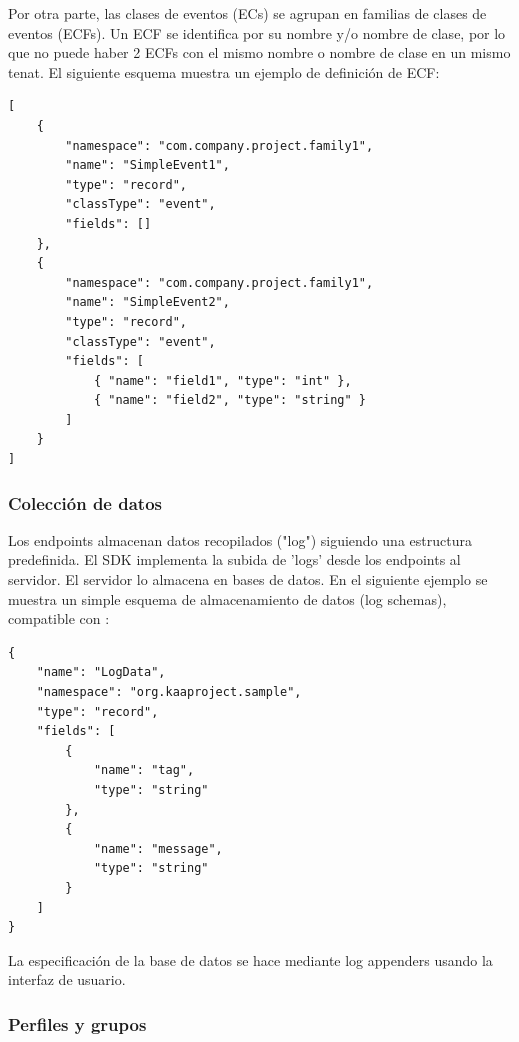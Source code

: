 \documentclass[12pt, twoside]{book}
\newcommand{\MYhref}[3][blue]{\href{#2}{\color{#1}{#3}}}
\begin{document}
Por otra parte, las clases de eventos (ECs) se agrupan en familias de clases de eventos (ECFs). Un ECF se identifica por su nombre y/o nombre de clase, por lo que no puede haber 2 ECFs con el mismo nombre o nombre de clase en un mismo tenat. El siguiente esquema muestra un ejemplo de definición de ECF:
\begin{lstlisting}
[
    {
        "namespace": "com.company.project.family1",
        "name": "SimpleEvent1",
        "type": "record",
        "classType": "event",
        "fields": []
    },
    {
        "namespace": "com.company.project.family1",
        "name": "SimpleEvent2",
        "type": "record",
        "classType": "event",
        "fields": [
            { "name": "field1", "type": "int" },
            { "name": "field2", "type": "string" }
        ]
    }
]
\end{lstlisting}
\subsubsection*{Colección de datos}
Los endpoints almacenan datos recopilados ("log") siguiendo una estructura predefinida. El SDK implementa la subida de 'logs' desde los endpoints al servidor. El servidor lo almacena en bases de datos. En el siguiente ejemplo se muestra un simple esquema de almacenamiento de datos (log schemas), compatible con \MYhref{http://avro.apache.org/docs/current/spec.html}{Avro Schema}:
\begin{lstlisting}
{
    "name": "LogData",
    "namespace": "org.kaaproject.sample",
    "type": "record",
    "fields": [
    	{
            "name": "tag",
            "type": "string"
        },
        {
            "name": "message",
            "type": "string"
        }
    ]
}
\end{lstlisting}
La especificación de la base de datos se hace mediante log appenders usando la interfaz de usuario. 
\subsubsection*{Perfiles y grupos}
\end{document}
